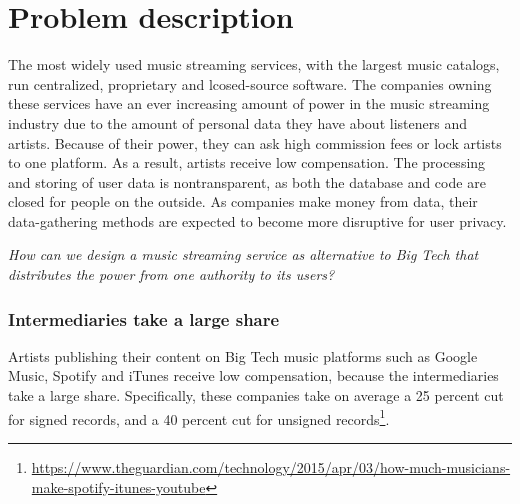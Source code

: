 \chapter{\label{chap:related-work}Problem description}
The most widely used music streaming services, with the largest music catalogs, run centralized, proprietary and lcosed-source software. The companies owning these services have an ever increasing amount of power in the music streaming industry due to the amount of personal data they have about listeners and artists. Because of their power, they can ask high commission fees or lock artists to one platform. As a result, artists receive low compensation. The processing and storing of user data is nontransparent, as both the database and code are closed for people on the outside. As companies make money from data, their data-gathering methods are expected to become more disruptive for user privacy.

\textit{How can we design a music streaming service as alternative to Big Tech that distributes the power from one authority to its users?}%
\subsection{Intermediaries take a large share}
Artists publishing their content on Big Tech music platforms such as Google Music, Spotify and iTunes receive low compensation, because the intermediaries take a large share. Specifically, these companies take on average a 25 percent cut for signed records, and a 40 percent cut for unsigned records\footnote{\url{https://www.theguardian.com/technology/2015/apr/03/how-much-musicians-make-spotify-itunes-youtube}}. 
